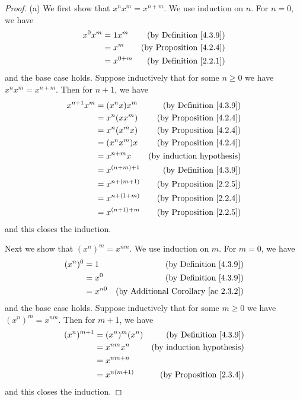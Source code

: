 \begin{proof}{(a)}
    We first show that \(x^n x^m = x^{n + m}\).
    We use induction on \(n\).
    For \(n = 0\), we have
    \begin{align*}
        x^0 x^m & = 1 x^m     & \text{(by Definition \ref{4.3.9})}  \\
                & = x^m       & \text{(by Proposition \ref{4.2.4})} \\
                & = x^{0 + m} & \text{(by Definition \ref{2.2.1})}
    \end{align*}
    and the base case holds.
    Suppose inductively that for some \(n \geq 0\) we have \(x^n x^m = x^{n + m}\).
    Then for \(n + 1\), we have
    \begin{align*}
        x^{n + 1} x^m & = (x^n x) x^m     & \text{(by Definition \ref{4.3.9})}  \\
                      & = x^n (x x^m)     & \text{(by Proposition \ref{4.2.4})} \\
                      & = x^n (x^m x)     & \text{(by Proposition \ref{4.2.4})} \\
                      & = (x^n x^m) x     & \text{(by Proposition \ref{4.2.4})} \\
                      & = x^{n + m} x     & \text{(by induction hypothesis)}    \\
                      & = x^{(n + m) + 1} & \text{(by Definition \ref{4.3.9})}  \\
                      & = x^{n + (m + 1)} & \text{(by Proposition \ref{2.2.5})} \\
                      & = x^{n + (1 + m)} & \text{(by Proposition \ref{2.2.4})} \\
                      & = x^{(n + 1) + m} & \text{(by Proposition \ref{2.2.5})}
    \end{align*}
    and this closes the induction.

    Next we show that \((x^n)^m = x^{nm}\).
    We use induction on \(m\).
    For \(m = 0\), we have
    \begin{align*}
        (x^n)^0 & = 1      & \text{(by Definition \ref{4.3.9})}              \\
                & = x^0    & \text{(by Definition \ref{4.3.9})}              \\
                & = x^{n0} & \text{(by Additional Corollary \ref{ac 2.3.2})}
    \end{align*}
    and the base case holds.
    Suppose inductively that for some \(m \geq 0\) we have \((x^n)^m = x^{nm}\).
    Then for \(m + 1\), we have
    \begin{align*}
        (x^n)^{m + 1} & = (x^n)^m (x^n) & \text{(by Definition \ref{4.3.9})}  \\
                      & = x^{nm} x^n    & \text{(by induction hypothesis)}    \\
                      & = x^{nm + n}                                          \\
                      & = x^{n(m + 1)}  & \text{(by Proposition \ref{2.3.4})}
    \end{align*}
    and this closes the induction.


\end{proof}
